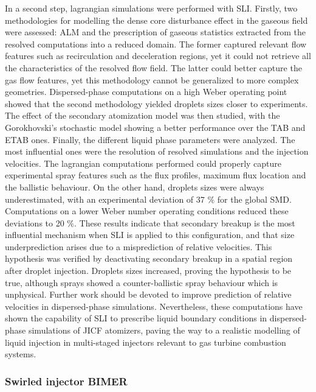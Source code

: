 In a second step, lagrangian simulations were performed with SLI. Firstly, two methodologies for modelling the dense core disturbance effect in the gaseous field were assessed: ALM and the prescription of gaseous statistics extracted from the resolved computations into a reduced domain. The former captured relevant flow features such as recirculation and deceleration regions, yet it could not retrieve all the characteristics of the resolved flow field. The latter could better capture the gas flow features, yet this methodology cannot be generalized to more complex geometries. Dispersed-phase computations on a high Weber operating point showed that the second methodology yielded droplets sizes closer to experiments. The effect of the secondary atomization model was then studied, with the Gorokhovski’s stochastic model showing a better performance over the TAB and ETAB ones. Finally, the different liquid phase parameters were analyzed. The most influential ones were the resolution of resolved simulations and the injection velocities. The lagrangian computations performed could properly capture experimental spray features such as the flux profiles, maximum flux location and the ballistic behaviour. On the other hand, droplets sizes were always underestimated, with an
experimental deviation of 37 $\%$ for the global SMD. Computations on a lower Weber number operating conditions reduced these deviations to 20 $\%$. These results indicate that secondary breakup is the most influential mechanism when SLI is applied to this configuration, and that size underprediction arises due to a misprediction of relative velocities. This hypothesis was verified by deactivating secondary breakup in a spatial region after droplet injection. Droplets sizes increased, proving the hypothesis to be true, although sprays showed a counter-ballistic spray behaviour which is unphysical. Further work should be devoted to improve prediction of relative velocities in dispersed-phase simulations. Nevertheless, these computations have shown the capability of SLI to prescribe liquid boundary conditions in dispersed-phase simulations of JICF atomizers, paving the way to a realistic modelling of liquid injection in multi-staged injectors relevant to gas turbine combustion systems.


\subsubsection*{Swirled injector BIMER}


